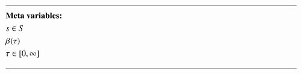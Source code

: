 \begin{alignat}{2}
	& \text{\rule{\linewidth}{0.4pt}} \notag \label{}                                                                                                                                                                                                                                                                                                                                                                     \\ 
	& \textbf{Meta variables:} \notag                                                                                                                                                                                                                                                                                                                                                \\ 
	& \ElementScheduler \in \SetScheduler                                                                                                                                                                                                                                                                                                                                           \label{eqn:meta:scheduler:strategic}  \\ 
	& \VarTacticalWork{}{}                                                                                                                                                                                                                                                                                                                                                          \label{eqn:meta:tactical:strategic}      \\ 
	& \tau \in [0, \infty]                                                                                                                                                                                                                                                                                                                                                          \label{eqn:meta:time:strategic}                                     \\ 
	& \text{\rule{\linewidth}{0.4pt}} \notag                                                                                                                                                                                                                                                                                                                                              \\

\end{alignat}
